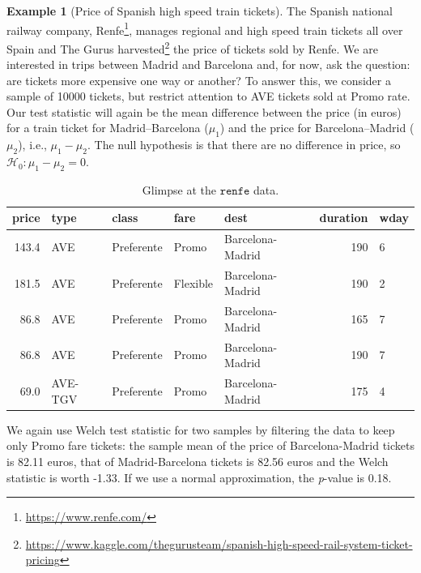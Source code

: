 \documentclass[
  11pt,
  letterpaper,
]{book}
\renewcommand{\href}[2]{#2\footnote{\url{#1}}}
\theoremstyle{definition}
\theoremstyle{definition}
\newtheorem{example}{Example}[chapter]
\theoremstyle{definition}
\theoremstyle{definition}
\theoremstyle{remark}
\begin{document}
\begin{example}[Price of Spanish high speed train tickets]
\protect\hypertarget{exm:price-trains-tests}{}\label{exm:price-trains-tests}The Spanish national railway company, \href{https://www.renfe.com/}{Renfe}, manages regional and high speed train tickets all over Spain and The Gurus \href{https://www.kaggle.com/thegurusteam/spanish-high-speed-rail-system-ticket-pricing}{harvested} the price of tickets sold by Renfe. We are interested in trips between Madrid and Barcelona and, for now, ask the question: are tickets more expensive one way or another? To answer this, we consider a sample of 10000 tickets, but restrict attention to AVE tickets sold at Promo rate. Our test statistic will again be the mean difference between the price (in euros) for a train ticket for Madrid--Barcelona (\(\mu_1\)) and the price for Barcelona--Madrid (\(\mu_2\)), i.e., \(\mu_1-\mu_2\). The null hypothesis is that there are no difference in price, so \(\mathscr{H}_0: \mu_1-\mu_2=0\).
\end{example}

\begin{table}

\caption{\label{tab:renfetest}Glimpse at the $\texttt{renfe}$ data.}
\centering
\begin{tabular}[t]{rllllrl}
\toprule
price & type & class & fare & dest & duration & wday\\
\midrule
143.4 & AVE & Preferente & Promo & Barcelona-Madrid & 190 & 6\\
181.5 & AVE & Preferente & Flexible & Barcelona-Madrid & 190 & 2\\
86.8 & AVE & Preferente & Promo & Barcelona-Madrid & 165 & 7\\
86.8 & AVE & Preferente & Promo & Barcelona-Madrid & 190 & 7\\
69.0 & AVE-TGV & Preferente & Promo & Barcelona-Madrid & 175 & 4\\
\bottomrule
\end{tabular}
\end{table}

We again use Welch test statistic for two samples by filtering the data to keep only Promo fare tickets: the sample mean of the price of Barcelona-Madrid tickets is 82.11 euros, that of Madrid-Barcelona tickets is 82.56 euros and the Welch statistic is worth -1.33. If we use a normal approximation, the \emph{p}-value is 0.18.
\end{document}

